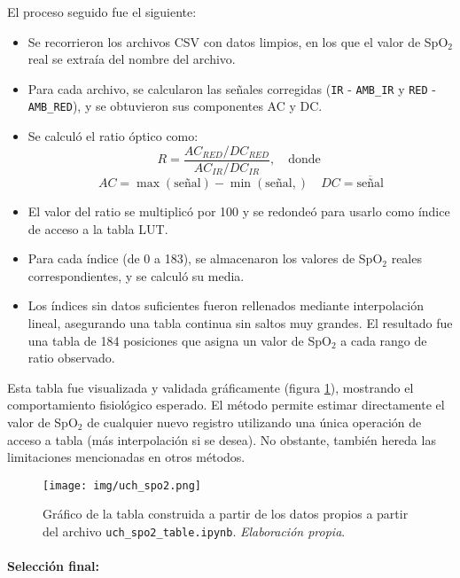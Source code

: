El proceso seguido fue el siguiente:

\begin{itemize}
    \item Se recorrieron los archivos CSV con datos limpios, en los que el valor de SpO$_2$ real se extraía del nombre del archivo.
    \item Para cada archivo, se calcularon las señales corregidas (\texttt{IR} - \texttt{AMB\_IR} y \texttt{RED} - \texttt{AMB\_RED}), y se obtuvieron sus componentes AC y DC.
    \item Se calculó el ratio óptico como:
    \begin{equation}
    R = \frac{AC_{RED}/DC_{RED}}{AC_{IR}/DC_{IR}}, \quad \text{donde }
    \end{equation}
    \begin{equation}
    AC = \max(\text{señal}) - \min(\text{señal},) \quad DC = \overline{\text{señal}}
    \end{equation}
    \item El valor del ratio se multiplicó por 100 y se redondeó para usarlo como índice de acceso a la tabla LUT.
    \item Para cada índice (de 0 a 183), se almacenaron los valores de SpO$_2$ reales correspondientes, y se calculó su media.
    \item Los índices sin datos suficientes fueron rellenados mediante interpolación lineal, asegurando una tabla continua sin saltos muy grandes. El resultado fue una tabla de 184 posiciones que asigna un valor de SpO$_2$ a cada rango de ratio observado.

\end{itemize}

Esta tabla fue visualizada y validada gráficamente (figura \ref{fig:uch_spo2}), mostrando el comportamiento fisiológico esperado. El método permite estimar directamente el valor de SpO$_2$ de cualquier nuevo registro utilizando una única operación de acceso a tabla (más interpolación si se desea). No obstante, también hereda las limitaciones mencionadas en otros métodos.

\begin{figure}[H]
    \centering
    \texttt{[image: img/uch\_spo2.png]}
    \caption{Gráfico de la tabla construida a partir de los datos propios a partir del archivo \texttt{uch\_spo2\_table.ipynb}. \textit{Elaboración propia}.}
    \label{fig:uch_spo2}
\end{figure}


\paragraph{Selección final:}

